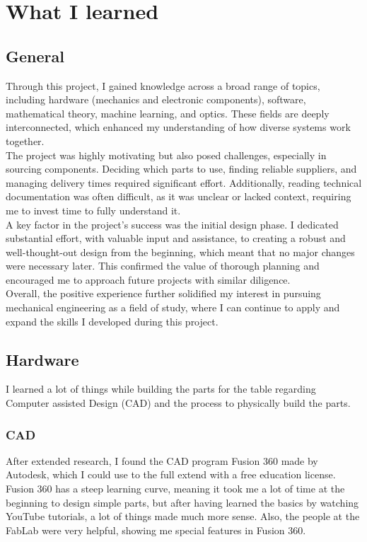 \section{What I learned}\label{sec:learned}

\subsection{General}\label{subsec:general_learned}
Through this project, I gained knowledge across a broad range of topics, including hardware (mechanics and electronic components), software, mathematical theory, machine learning, and optics.
These fields are deeply interconnected, which enhanced my understanding of how diverse systems work together.\\
The project was highly motivating but also posed challenges, especially in sourcing components.
Deciding which parts to use, finding reliable suppliers, and managing delivery times required significant effort.
Additionally, reading technical documentation was often difficult, as it was unclear or lacked context, requiring me to invest time to fully understand it.\\
A key factor in the project’s success was the initial design phase.
I dedicated substantial effort, with valuable input and assistance, to creating a robust and well-thought-out design from the beginning, which meant that no major changes were necessary later.
This confirmed the value of thorough planning and encouraged me to approach future projects with similar diligence.\\
Overall, the positive experience further solidified my interest in pursuing mechanical engineering as a field of study, where I can continue to apply and expand the skills I developed during this project.

\subsection{Hardware}\label{subsec:hardware}
I learned a lot of things while building the parts for the table regarding Computer assisted Design (CAD) and the process to physically build the parts.

\subsubsection{CAD}
After extended research, I found the CAD program Fusion 360\autocite{fusion360} made by Autodesk, which I could use to the full extend with a free education license\autocite{autodesk-education}.
Fusion 360 has a steep learning curve, meaning it took me a lot of time at the beginning to design simple parts, but after having learned the basics by watching YouTube\autocite{youtube,fusion360-tutorial} tutorials, a lot of things made much more sense.
Also, the people at the FabLab\autocite{fablab} were very helpful, showing me special features in Fusion 360\autocite{fusion360}.

